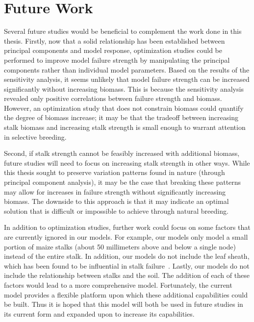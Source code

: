\section{Future Work}
\label{sec:future_work}
Several future studies would be beneficial to complement the work done in this thesis. Firstly, now that a solid relationship has been established between principal components and model response, optimization studies could be performed to improve model failure strength by manipulating the principal components rather than individual model parameters. Based on the results of the sensitivity analysis, it seems unlikely that model failure strength can be increased significantly without increasing biomass. This is because the sensitivity analysis revealed only positive correlations between failure strength and biomass. However, an optimization study that does not constrain biomass could quantify the degree of biomass increase; it may be that the tradeoff between increasing stalk biomass and increasing stalk strength is small enough to warrant attention in selective breeding.

Second, if stalk strength cannot be feasibly increased with additional biomass, future studies will need to focus on increasing stalk strength in other ways. While this thesis sought to preserve variation patterns found in nature (through principal component analysis), it may be the case that breaking these patterns may allow for increases in failure strength without significantly increasing biomass. The downside to this approach is that it may indicate an optimal solution that is difficult or impossible to achieve through natural breeding.

In addition to optimization studies, further work could focus on some factors that are currently ignored in our models. For example, our models only model a small portion of maize stalks (about 50 millimeters above and below a single node) instead of the entire stalk. In addition, our models do not include the leaf sheath, which has been found to be influential in stalk failure~. Lastly, our models do not include the relationship between stalks and the soil. The addition of each of these factors would lead to a more comprehensive model. Fortunately, the current model provides a flexible platform upon which these additional capabilities could be built. Thus it is hoped that this model will both be used in future studies in its current form and expanded upon to increase its capabilities. 

